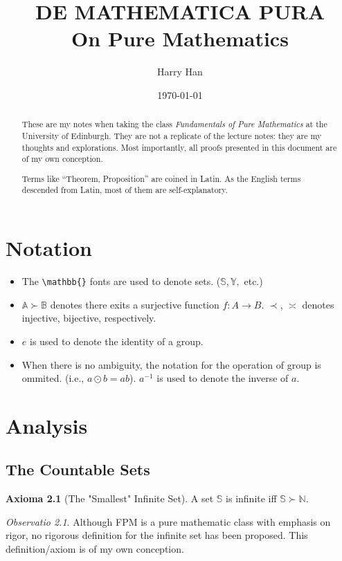 \documentclass[12pt, a4paper]{report}
\title{
	DE MATHEMATICA PURA \\
	\large On Pure Mathematics
}
\author{Harry Han}
\date{\today}
\theoremstyle{definition}
\theoremstyle{definition}
\newtheorem{axiom}{Axioma}[section]
\theoremstyle{remark}
\newtheorem{remark}{Observatio}[section]
\begin{document}
\maketitle
\tableofcontents

\newpage

\begin{abstract}
	These are my notes when taking the class \emph{Fundamentals of Pure Mathematics} at the University of Edinburgh. They are not a replicate of the lecture notes: they are my thoughts and explorations. 
	Most importantly, all proofs presented in this document are of my own conception. 

	Terms like ``Theorem, Proposition'' are coined in Latin. As the English terms descended from Latin, most of them are self-explanatory. 
\end{abstract}
\chapter{Notation}

\begin{itemize}
	\item The \verb|\mathbb{}| fonts are used to denote sets. ($\mathbb{S}, \mathbb{Y},$ etc.)
	\item $\mathbb{A} \succ \mathbb{B}$ denotes there exits a surjective function $f:A\rightarrow B$. $\prec$, $\asymp$ denotes injective, bijective, respectively.
	\item $e$ is used to denote the identity of a group.
	\item When there is no ambiguity, the notation for the operation of group is ommited. (i.e., $a \odot b = ab$).
		$a^{-1}$ is used to denote the inverse of $a$.

\end{itemize}

\chapter{Analysis}
\section{The Countable Sets}

\begin{axiom}[The "Smallest" Infinite Set]
	A set $\mathbb{S}$ is infinite iff $\mathbb{S} \succ \mathbb{N}$. 
\end{axiom}

\begin{remark}
	Although FPM is a pure mathematic class with emphasis on rigor, no rigorous definition for the infinite set has been proposed. This definition/axiom is of my own conception.
\end{remark}
\end{document}
